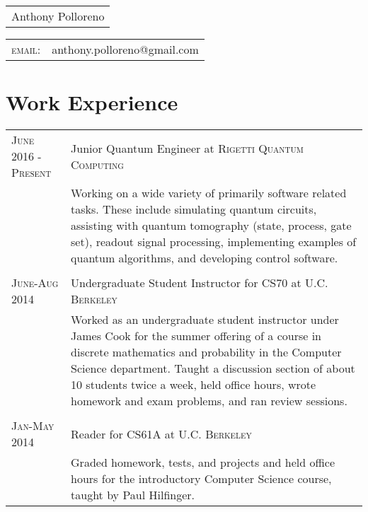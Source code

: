 \documentclass[a4paper,10pt]{article}
\begin{document}
\newcommand*{\fontin}[2]{{\setmainfont{Fontin}#1{#2}}}

\pagestyle{empty} %




\begin{tabular}{l}

{\Huge Anthony Polloreno}\\\end{tabular} \hfill
\begin{tabular}{lr}
    \fontin{\textsc}{email:}     & anthony.polloreno@gmail.com
\end{tabular}

\section{Work Experience}
\begin{tabularx}{\textwidth}{l|X}
\fontin{\textsc}{June 2016 - Present} & Junior Quantum Engineer at \fontin{\textsc}{Rigetti Quantum Computing} \\ & 
\footnotesize{Working on a wide variety of primarily software related tasks. These include simulating quantum circuits, assisting with quantum tomography (state, process, gate set), readout signal processing, implementing examples of quantum algorithms, and developing control software.}\\\multicolumn{2}{c}{} \\

 \fontin{\textsc}{June-Aug 2014} & Undergraduate Student Instructor for CS70 at \fontin{\textsc}{U.C. Berkeley} \\&\footnotesize{Worked as an undergraduate student instructor under James Cook for the summer offering of a course in discrete mathematics and probability in the Computer Science department. Taught a discussion section of about 10 students twice a week, held office hours, wrote homework and exam problems, and ran review sessions.}\\\multicolumn{2}{c}{} \\
\fontin{\textsc}{Jan-May 2014} & Reader for  CS61A at \fontin{\textsc}{U.C. Berkeley}\\&\footnotesize{Graded homework, tests, and projects and held office hours for the introductory Computer Science course, taught by Paul Hilfinger.}
\end{tabularx}
\end{document}

